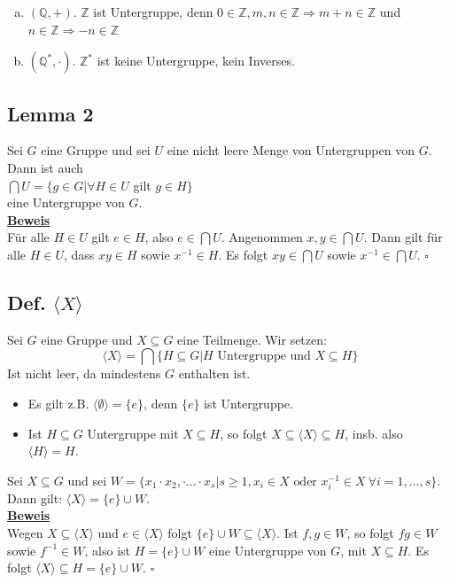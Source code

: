 \documentclass[a4paper, pagesize=pdftex, pdftex, twoside, headsepline, index=totoc,toc=listof, fontsize=10pt, cleardoublepage=empty, headinclude, DIV=13, BCOR=13mm]{scrartcl}
\newcommand{\bet}[1]{\uline{\textbf{#1}}} %
\newcommand{\lh}[1]{\langle #1 \rangle} %
\begin{document}
\begin{enumerate}[(a)]
	\item $(\mathds{Q}, +)$. $\mathds{Z}$  ist Untergruppe, denn $0 \in \mathds{Z}, m,n \in \mathds{Z} \Rightarrow m+n\in \mathds{Z}$ und $n\in \mathds{Z} \Rightarrow -n\in \mathds{Z}$
	\item $(\mathds{Q}^*,\cdot)$. $\mathds{Z}^*$ ist keine Untergruppe, kein Inverses.
\end{enumerate}

\subsection{Lemma 2}
\label{sub:lemma_2}
Sei $G$ eine Gruppe und sei $U$ eine nicht leere Menge von Untergruppen von $G$. Dann ist auch\\
$\bigcap U = \{g\in G | \forall H\in U$ gilt $g\in H\}$\\
eine Untergruppe von $G$.\\
\bet{Beweis}\\
Für alle $H\in U$ gilt $e\in H$, also $e\in \bigcap U$. Angenommen $x,y\in \bigcap U$. Dann gilt für alle $H\in U$, dass $xy\in H$ sowie $x^{-1}\in H$. Es folgt $xy\in \bigcap U$ sowie $x^{-1}\in \bigcap U$.
\hfill $\square$

\subsection{Def. $\lh{X}$}
\label{sub:def_lhX}
Sei $G$ eine Gruppe und $X \subseteq G$ eine Teilmenge. Wir setzen:
\[\lh{X}=\bigcap\{H\subseteq G | H \text{ Untergruppe und } X \subseteq H\}\]
Ist nicht leer, da mindestens $G$ enthalten ist.
\begin{itemize}
	\item Es gilt z.B. $\lh{\emptyset}=\{e\}$, denn $\{e\}$ ist Untergruppe.
	\item Ist $H \subseteq G$ Untergruppe mit $X \subseteq H$, so folgt $X\subseteq \lh{X} \subseteq H$, insb. also $\lh{H}=H$.
\end{itemize}

Sei $X \subseteq G$ und sei $W=\{x_1\cdot x_2,\cdot \dots \cdot x_s | s\ge 1, x_i\in X \text{ oder } x_i^{-1}\in X ~\forall i=1,\dots,s\}$.\\
Dann gilt: $ \lh{X}=\{e\}\cup W$.\\
\bet{Beweis}\\
Wegen $X\subseteq \lh{X}$ und $e\in \lh{X}$ folgt $\{e\}\cup W\subseteq \lh{X}$. Ist $f,g\in W$, so folgt $fg\in W$ sowie $f^{-1}\in W$, also ist $H=\{e\}\cup W$ eine Untergruppe von $G$, mit $X\subseteq H$. Es folgt $\lh{X}\subseteq H=\{e\}\cup W$.
\hfill $\square$
\end{document}

